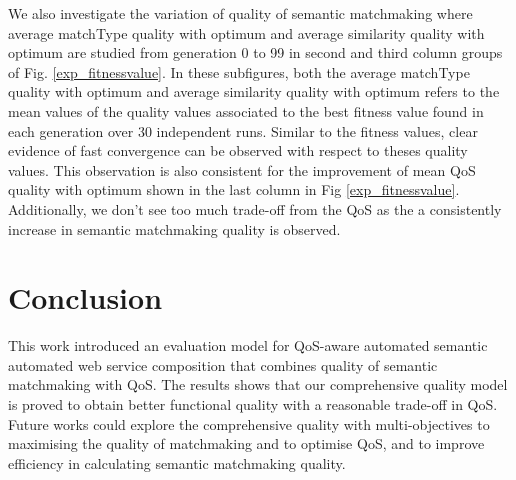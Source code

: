 \documentclass{IEEEtran}
\begin{document}
We also investigate the variation of quality of semantic matchmaking where average matchType quality with optimum and average similarity quality with optimum are studied from generation 0 to 99 in second and third column groups of Fig. \ref{exp_fitnessvalue}. In these subfigures, both the average matchType quality with optimum and average similarity quality with optimum refers to the mean values of the quality values associated to the best fitness value found in each generation over 30 independent runs. Similar to the fitness values, clear evidence of fast convergence can be observed with respect to theses quality values. This observation is also consistent for the improvement of mean QoS quality with optimum shown in the last column in Fig \ref{exp_fitnessvalue}. Additionally, we don't see too much trade-off from the QoS as the a consistently increase in semantic matchmaking quality is observed.

\section{Conclusion}\label{conclusion}
This work introduced an evaluation model for QoS-aware automated semantic automated web service composition that combines quality of semantic matchmaking with QoS. The results shows that our comprehensive quality model is proved to obtain better functional quality with a reasonable trade-off in QoS. Future works could explore the comprehensive quality with multi-objectives to maximising the quality of matchmaking and to optimise QoS, and to improve efficiency in calculating semantic matchmaking quality.


\end{document}
